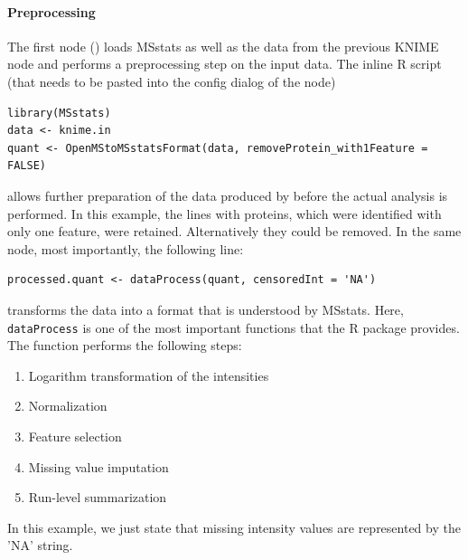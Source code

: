 \paragraph{Preprocessing} \mbox{}\newline
\noindent The first node () loads MSstats as well as the data from the previous KNIME node and performs a preprocessing step on the input data. The inline R script (that needs to be pasted into the config dialog of the node)
\begin{lstlisting}
library(MSstats)
data <- knime.in
quant <- OpenMStoMSstatsFormat(data, removeProtein_with1Feature = FALSE)
\end{lstlisting}
allows further preparation of the data produced by  before the actual analysis is performed. In this example, the 
lines with proteins, which were identified with only one feature, were retained. Alternatively they could be removed.
\newline
\noindent In the same node, most importantly, the following line:
\begin{lstlisting}
processed.quant <- dataProcess(quant, censoredInt = 'NA')
\end{lstlisting}
transforms the data into a format that is understood by MSstats.
Here, \texttt{dataProcess} is one of the most important functions that the
R package provides. The function performs the following steps:
\begin{enumerate}
	\item
	Logarithm transformation of the intensities
	\item
	Normalization
	\item
	Feature selection
	\item
	Missing value imputation
	\item
	Run-level summarization
\end{enumerate}
In this example, we just state that missing intensity values are represented by the 'NA' string. 


